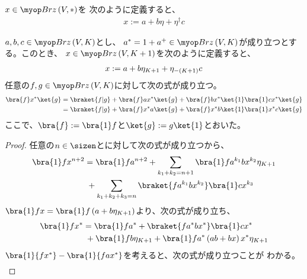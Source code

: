 {	\begin{proposition}[Dyck摂動]\label{prop:Dyck摂動バックアップ} %
		$x\in\Brz\lr{V,*}$を
		次のように定義すると、
		\begin{equation*}\begin{split}
			x := a + b\eta + \eta^\dag c
		\end{split}\end{equation*}
		
		$a,b,c\in \Brz\lr{V,K}$とし、
		$a^*=1+a^+\in\Brz\lr{V,K}$が成り立つとする。このとき、
		$x\in \Brz\lr{V,K+1}$を次のように定義すると、
		\begin{equation*}\begin{split}
			x := a + b\eta_{K+1} + \eta_{-\left({K+1}\right)}c
		\end{split}\end{equation*}
		任意の$f,g\in\Brz\lr{V,K}$に対して次の式が成り立つ。
		\begin{equation*}\begin{split}
			\bra{f}x^*\ket{g} &= \braket{f|g} + \bra{f}ax^*\ket{g} 
				+ \bra{f}bx^*\ket{1}\bra{1}cx^*\ket{g} \\
			&= \braket{f|g} + \bra{f}x^*a\ket{g} 
				+ \bra{f}x^*b\ket{1}\bra{1}x^*c\ket{g}
		\end{split}\end{equation*}
		ここで、$\bra{f}:=\bra{1}f$と$\ket{g}:=g\ket{1}$とおいた。
	\end{proposition} %
	\begin{proof} %
		任意の$n\in\sizen$とに対して次の式が成り立つから、
		\begin{equation*}\begin{split}
			\bra{1}fx^{n+2} &= \bra{1}fa^{n+2}
			+ \sum_{k_1+k_2=n+1} \bra{1}fa^{k_1}bx^{k_2}\eta_{K+1} \\
			&\;+ \sum_{k_1+k_2+k_3=n} \braket{fa^{k_1}bx^{k_2}}\bra{1}cx^{k_3}
		\end{split}\end{equation*}
		$\bra{1}fx=\bra{1}f\lr{a+b\eta_{K+1}}$より、次の式が成り立ち、
		\begin{equation*}\begin{split}
			\bra{1}fx^* &= \bra{1}fa^* + \braket{fa^*bx^*}\bra{1}cx^* \\
			&\; + \bra{1}fb\eta_{K+1} + \bra{1}fa^*\lr{ab + bx}x^*\eta_{K+1}
		\end{split}\end{equation*}
		$\bra{1}{fx^*}-\bra{1}{fax^*}$を考えると、次の式が成り立つことが
		わかる。
		\begin{equation*}\begin{split}

\end{split}
\end{equation*}
\end{proof}}
